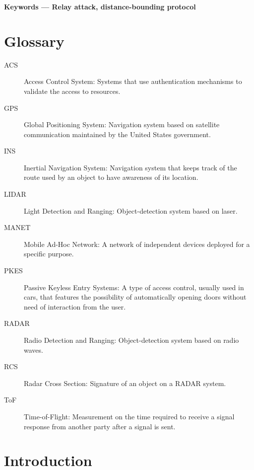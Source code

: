 \documentclass{article}
\begin{document}
{\bf Keywords --- Relay attack, distance-bounding protocol} 

\newpage

\section*{Glossary}
\addtocounter{section}{0}

\begin{description}
  \item[ACS] Access Control System: Systems that use authentication mechanisms to validate the access to resources.
  \item[GPS] Global Positioning System: Navigation system based on satellite communication maintained by the United States government.
  \item[INS] Inertial Navigation System: Navigation system that keeps track of the route used by an object to have awareness of its location.
  \item[LIDAR] Light Detection and Ranging: Object-detection system based on laser.
  \item[MANET] Mobile Ad-Hoc Network: A network of independent devices deployed for a specific purpose.
  \item[PKES] Passive Keyless Entry Systems: A type of access control, usually used in cars, that features the possibility of automatically opening doors without need of interaction from the user.
  \item[RADAR] Radio Detection and Ranging: Object-detection system based on radio waves.
  \item[RCS] Radar Cross Section: Signature of an object on a RADAR system.
  \item[ToF] Time-of-Flight: Measurement on the time required to receive a signal response from another party after a signal is sent.
\end{description}

\newpage



\tableofcontents





\newpage








\section{Introduction}
\label{sec:introduction}
\end{document}
